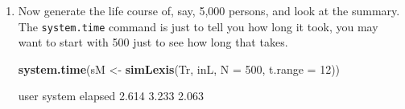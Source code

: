 \documentclass[
]{book}
\newenvironment{Shaded}{\begin{snugshade}}{\end{snugshade}}
\newcommand{\AttributeTok}[1]{\textcolor[rgb]{0.13,0.29,0.53}{#1}}
\newcommand{\DecValTok}[1]{\textcolor[rgb]{0.00,0.00,0.81}{#1}}
\newcommand{\FunctionTok}[1]{\textcolor[rgb]{0.13,0.29,0.53}{\textbf{#1}}}
\newcommand{\NormalTok}[1]{#1}
\newcommand{\OtherTok}[1]{\textcolor[rgb]{0.56,0.35,0.01}{#1}}
\newcommand{\StringTok}[1]{\textcolor[rgb]{0.31,0.60,0.02}{#1}}
\begin{document}
\begin{enumerate}
\begin{Shaded}
\begin{Highlighting}[]
\FunctionTok{summary}\NormalTok{(iL, }\AttributeTok{by =} \StringTok{"sex"}\NormalTok{)}
\end{Highlighting}
\end{Shaded}

\begin{Shaded}
\begin{Highlighting}[]
\NormalTok{$M}

\NormalTok{Transitions:}
\NormalTok{     To}
\NormalTok{From  NRA Rem ESRD ESRD(Rem)  Records:  Events: Risk time:  Persons:}
\NormalTok{  NRA   0   1    9         0        10       10      48.12        10}
\NormalTok{  Rem   0   1    0         0         1        0      18.01         1}
\NormalTok{  Sum   0   2    9         0        11       10      66.12        10}

\NormalTok{$F}

\NormalTok{Transitions:}
\NormalTok{     To}
\NormalTok{From  NRA Rem ESRD ESRD(Rem)  Records:  Events: Risk time:  Persons:}
\NormalTok{  NRA   0   2    8         0        10       10      51.87        10}
\NormalTok{  Rem   0   0    0         2         2        2      11.75         2}
\NormalTok{  Sum   0   2    8         2        12       12      63.62        10}
\end{Highlighting}
\end{Shaded}

  What type of object have you got as \texttt{iL}?
\item
  Now generate the life course of, say, 5,000 persons, and look at the summary.
  The \texttt{system.time} command is just to tell you how long it
  took, you may want to start with 500 just to see how long that takes.

\begin{Shaded}
\begin{Highlighting}[]
\FunctionTok{system.time}\NormalTok{(sM }\OtherTok{\textless{}{-}} \FunctionTok{simLexis}\NormalTok{(Tr, inL, }\AttributeTok{N =} \DecValTok{500}\NormalTok{, }\AttributeTok{t.range =} \DecValTok{12}\NormalTok{))}
\end{Highlighting}
\end{Shaded}

\begin{Shaded}
\begin{Highlighting}[]
\NormalTok{   user  system elapsed }
\NormalTok{  2.614   3.233   2.063 }
\end{Highlighting}
\end{Shaded}


\end{enumerate}
\end{document}
